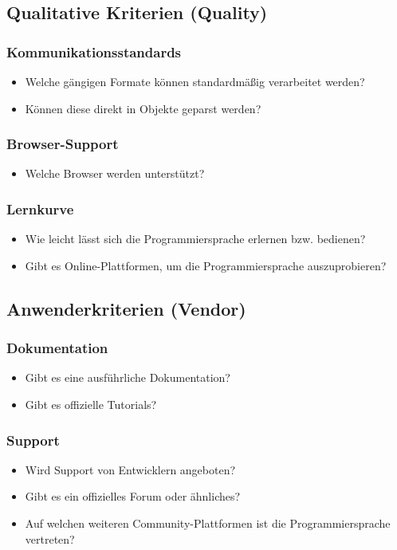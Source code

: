 \subsection{Qualitative Kriterien (Quality)}\label{sec:qualityCriteria}
\subsubsection{Kommunikationsstandards}
\begin{itemize}
	\item Welche gängigen Formate können standardmäßig verarbeitet werden?
	\item Können diese direkt in Objekte geparst werden?
\end{itemize}

\subsubsection{Browser-Support}
\begin{itemize}
	\item Welche Browser werden unterstützt?
\end{itemize}

\subsubsection{Lernkurve}
\begin{itemize}
	\item Wie leicht lässt sich die Programmiersprache erlernen bzw. bedienen?
	\item Gibt es Online-Plattformen, um die Programmiersprache auszuprobieren?
\end{itemize}
 
\subsection{Anwenderkriterien (Vendor)}\label{sec:vendorCriteria}
\subsubsection{Dokumentation}
\begin{itemize}
	\item Gibt es eine ausführliche Dokumentation?
	\item Gibt es offizielle Tutorials?
\end{itemize}

\subsubsection{Support}
\begin{itemize}
	\item Wird Support von Entwicklern angeboten?
	\item Gibt es ein offizielles Forum oder ähnliches?
	\item Auf welchen weiteren Community-Plattformen ist die Programmiersprache vertreten? 
\end{itemize}


